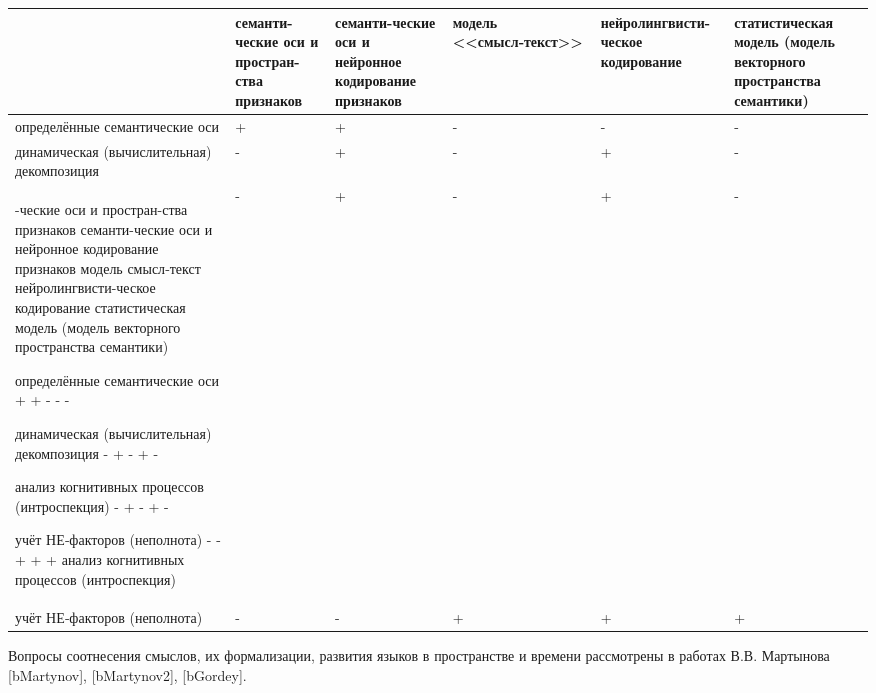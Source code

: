 \begin{tabular}{|>{\centering\arraybackslash}m{3cm}|>{\centering\arraybackslash}m{2cm}|>{\centering\arraybackslash}m{2cm}|>{\centering\arraybackslash}m{3cm}|>{\centering\arraybackslash}m{3cm}|>{\centering\arraybackslash}m{3cm}|}
	\hline
& семанти-ческие оси и простран-ства признаков
& семанти-ческие оси и нейронное кодирование признаков
& модель <<смысл‑текст>>
& нейролингвисти-ческое кодирование
& статистическая модель (модель векторного пространства семантики)
\\
	\hline
	определённые семантические оси
	& +
	& +
	& -
	& -
	& -
	\\
	\hline
	динамическая (вычислительная) декомпозиция
	& -
	& +
	& -
	& +
	& -
	\\
	-ческие оси и простран-ства признаков
	семанти-ческие оси и нейронное кодирование признаков
	модель смысл‑текст
	нейролингвисти-ческое кодирование
	статистическая модель (модель векторного пространства семантики)
	
	определённые семантические оси
	+
	+
	-
	-
	-
	
	динамическая (вычислительная) декомпозиция
	-
	+
	-
	+
	-
	
	анализ когнитивных процессов (интроспекция)
	-
	+
	-
	+
	-
	
	учёт НЕ‑факторов (неполнота)
	-
	-
	+
	+
	+
анализ когнитивных процессов (интроспекция)
 & -
 & +
 & -
 & +
 & -
 \\
	\hline
учёт НЕ‑факторов (неполнота)
 & -
 & -
 & +
 & +
 & +
 \\
	\hline
\end{tabular}






Вопросы соотнесения смыслов, их формализации, развития языков в пространстве и времени рассмотрены в работах В.В. Мартынова [bMartynov], [bMartynov2], [bGordey].

%